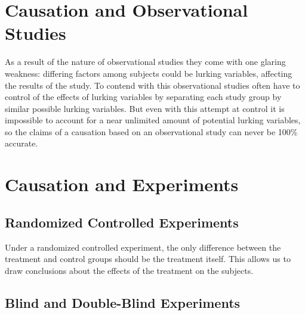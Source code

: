 \documentclass[12pt letter]{report}
\begin{document}
\section{Causation and Observational Studies}

As a result of the nature of observational studies they come with one glaring weakness: differing factors among subjects
could be lurking variables, affecting the results of the study. To contend with this observational studies often have to
control of the effects of lurking variables by separating each study group by similar possible lurking variables. But
even with this attempt at control it is impossible to account for a near unlimited amount of potential lurking
variables, so the claims of a causation based on an observational study can never be 100\% accurate.



\section{Causation and Experiments}






\subsection{Randomized Controlled Experiments}


Under a randomized controlled experiment, the only difference between the treatment and control groups should be the
treatment itself. This allows us to draw conclusions about the effects of the treatment on the subjects.

\subsection{Blind and Double-Blind Experiments}
\end{document}
